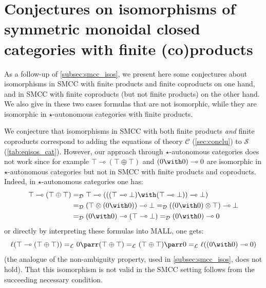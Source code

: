 \documentclass{lmcs}
\newcommand*{\tens}{\otimes} %
\newcommand*{\lolipop}{\multimap} %
\newcommand*{\Eu}{\mathcal{L}} %
\newcommand*{\eqeq}{=} %
\newcommand*{\eqEu}[1][]{\eqeq_{\Eu_{#1}}} %
\newcommand*{\isom}{\eqEu} %
\newcommand*{\thD}{\mathcal{D}}
\newcommand*{\isoc}{\eqeq_\thD} %
\newcommand*{\thS}{\mathcal{S}}
\newcommand*{\thCP}{\mathcal{C}}
\newcommand*{\tradm}[1]{\ell(#1)}
\begin{document}

\section{Conjectures on isomorphisms of symmetric monoidal closed categories with finite (co)products}
\label{sec:conjectures_isos_smcc}

As a follow-up of \autoref{subsec:smcc_isos},
we present here some conjectures about isomorphisms in SMCC with finite products and finite coproducts on one hand, and in SMCC with finite coproducts (but not finite products) on the other hand.
We also give in these two cases formulas that are not isomorphic, while they are isomorphic in $\star$-autonomous categories with finite products.

We conjecture that isomorphisms in SMCC with both finite products \emph{and} finite coproducts correspond to adding the equations of theory $\thCP$ (\autoref{sec:conclu}) to $\thS$ (\autoref{tab:eqisos_cat}).
However, our approach through $\star$-autonomous categories does not work since for example $\top\lolipop(\top\oplus\top)$ and $(0\with 0)\lolipop 0$ are isomorphic in $\star$-autonomous categories but not in SMCC with finite products and coproducts.
Indeed, in $\star$-autonomous categories one has:
\begin{align*}
  \top\lolipop(\top\oplus\top) &\isoc \top\lolipop(((\top\lolipop\bot)\with(\top\lolipop\bot))\lolipop\bot)\\ &\isoc (\top\tens(0\with 0))\lolipop\bot \isoc ((0\with 0)\tens\top)\lolipop\bot\\ &\isoc (0\with 0)\lolipop(\top\lolipop\bot) \isoc (0\with 0)\lolipop 0
\end{align*}
or directly by interpreting these formulas into MALL, one gets:
\begin{equation*}
\tradm{\top\lolipop(\top\oplus\top)}\isom 0\parr(\top\oplus\top) \isom (\top\oplus\top)\parr 0\isom\tradm{(0\with 0)\lolipop 0}
\end{equation*}
(the analogue of the non-ambiguity property, used in \autoref{subsec:smcc_isos}, does not hold).
That this isomorphism is not valid in the SMCC setting follows from the succeeding necessary condition.
\end{document}
